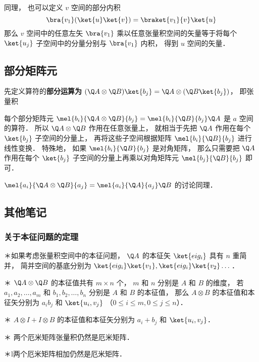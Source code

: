 同理， 也可以定义 $v$ 空间的部分内积
\begin{equation}
\bra{v_1}(\ket{u}\ket{v}) = \braket{v_1}{v} \ket{u}
\end{equation}
那么 $v$ 空间中的任意左矢 $\bra{v_1}$ 乘以任意张量积空间的矢量等于将每个 $\ket{u_j}$ 子空间中的分量分别与 $\bra{v_1}$ 内积， 得到 $u$ 空间的矢量．

\subsection{部分矩阵元}
先定义算符的\textbf{部分运算为} $(\Q A \otimes \Q B) \ket{b_j} = \Q A \otimes (\Q B \ket{b_j})$， 即张量积

每个部分矩阵元 $\mel{b_i}{\Q A \otimes \Q B}{b_j} = \mel{b_i}{\Q B}{b_j} \Q A$ 是 $a$ 空间的算符． 所以 $\Q A \otimes \Q B$ 作用在任意张量上， 就相当于先把 $\Q A$ 作用在每个 $\ket{b_j}$ 子空间的分量上， 再将这些子空间根据矩阵 $\mel{b_i}{\Q B}{b_j}$ 进行线性变换． 特殊地， 如果 $\mel{b_i}{\Q B}{b_j}$ 是对角矩阵， 那么只需要把 $\Q A$ 作用在每个 $\ket{b_j}$ 子空间的分量上再乘以对角矩阵元 $\mel{b_j}{\Q B}{b_j}$ 即可．

$\mel{a_i}{\Q A \otimes \Q B}{a_j} = \mel{a_i}{\Q A}{a_j} \Q B$ 的讨论同理．

\subsection{其他笔记}

\subsubsection{关于本征问题的定理}%
	
＊如果考虑张量积空间中的本征问题， $\Q A$  的本征矢 $\ket{eig_i}$ 具有 $n$ 重简并， 简并空间的基底分别为 $\ket{eig_i}\ket{v_1}, \ket{eig_i}\ket{v_2}\dots$． 

＊ $\Q A \otimes \Q B$ 的本征值共有 $m \times n$ 个， $m$ 和 $n$ 分别是 $A$ 和 $B$ 的维度， 若 $a_1, a_2,\dots, a_m$ 和 $b_1, b_2, \dots, b_n$ 分别是 $A$ 和 $B$ 的本征值， 那么 $A \otimes B$ 的本征值和本征矢分别为 $a_i b_j$ 和 $\ket{u_i, v_j}$ （$0 \leqslant i \leqslant m,  0 \leqslant j \leqslant n$）．

＊ $A \otimes I + I \otimes B$ 的本征值和本征矢分别为 $a_i + b_j$ 和 $\ket{u_i, v_j}$． 

＊ 两个厄米矩阵张量积仍然是厄米矩阵．

＊l两个厄米矩阵相加仍然是厄米矩阵．

